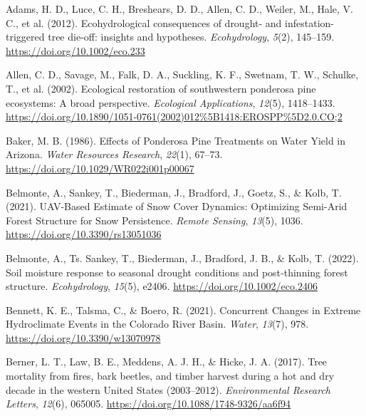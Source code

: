 \documentclass[
]{agujournal2019}
\newlength{\cslhangindent}
\newenvironment{CSLReferences}[2] %
 {\begin{list}{}{%
  \setlength{\itemindent}{0pt}
  \setlength{\leftmargin}{0pt}
  \setlength{\parsep}{0pt}
  \ifodd #1
   \setlength{\leftmargin}{\cslhangindent}
   \setlength{\itemindent}{-1\cslhangindent}
  \fi
  \setlength{\itemsep}{#2\baselineskip}}}
 {\end{list}}
\begin{document}
\label{refs}
\begin{CSLReferences}{1}{0}
\vspace{1em}

Adams, H. D., Luce, C. H., Breshears, D. D., Allen, C. D., Weiler, M.,
Hale, V. C., et al. (2012). Ecohydrological consequences of drought{-}
and infestation{-} triggered tree die{-}off: insights and hypotheses.
\emph{Ecohydrology}, \emph{5}(2), 145--159.
\url{https://doi.org/10.1002/eco.233}

Allen, C. D., Savage, M., Falk, D. A., Suckling, K. F., Swetnam, T. W.,
Schulke, T., et al. (2002). Ecological restoration of southwestern
ponderosa pine ecosystems: A broad perspective. \emph{Ecological
Applications}, \emph{12}(5), 1418--1433.
\url{https://doi.org/10.1890/1051-0761(2002)012\%5B1418:EROSPP\%5D2.0.CO;2}

Baker, M. B. (1986). Effects of {Ponderosa} {Pine} {Treatments} on
{Water} {Yield} in {Arizona}. \emph{Water Resources Research},
\emph{22}(1), 67--73. \url{https://doi.org/10.1029/WR022i001p00067}

Belmonte, A., Sankey, T., Biederman, J., Bradford, J., Goetz, S., \&
Kolb, T. (2021). {UAV}-{Based} {Estimate} of {Snow} {Cover} {Dynamics}:
{Optimizing} {Semi}-{Arid} {Forest} {Structure} for {Snow}
{Persistence}. \emph{Remote Sensing}, \emph{13}(5), 1036.
\url{https://doi.org/10.3390/rs13051036}

Belmonte, A., Ts. Sankey, T., Biederman, J., Bradford, J. B., \& Kolb,
T. (2022). Soil moisture response to seasonal drought conditions and
post‐thinning forest structure. \emph{Ecohydrology}, \emph{15}(5),
e2406. \url{https://doi.org/10.1002/eco.2406}

Bennett, K. E., Talsma, C., \& Boero, R. (2021). Concurrent {Changes} in
{Extreme} {Hydroclimate} {Events} in the {Colorado} {River} {Basin}.
\emph{Water}, \emph{13}(7), 978. \url{https://doi.org/10.3390/w13070978}

Berner, L. T., Law, B. E., Meddens, A. J. H., \& Hicke, J. A. (2017).
Tree mortality from fires, bark beetles, and timber harvest during a hot
and dry decade in the western {United} {States} (2003--2012).
\emph{Environmental Research Letters}, \emph{12}(6), 065005.
\url{https://doi.org/10.1088/1748-9326/aa6f94}


\end{CSLReferences}
\end{document}
